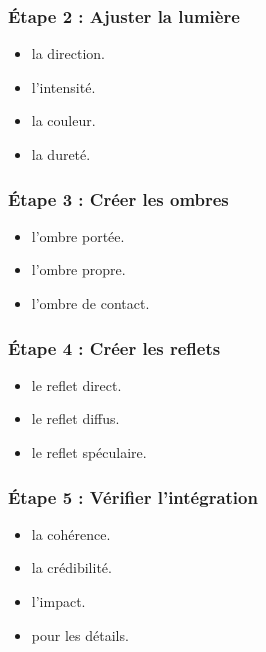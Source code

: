 \subsubsection{Étape 2 : Ajuster la lumière}

\begin{itemize}
    \item {} la direction.
    \item {} l'intensité.
    \item {} la couleur.
    \item {} la dureté.
\end{itemize}

\subsubsection{Étape 3 : Créer les ombres}

\begin{itemize}
    \item {} l'ombre portée.
    \item {} l'ombre propre.
    \item {} l'ombre de contact.
\end{itemize}

\subsubsection{Étape 4 : Créer les reflets}

\begin{itemize}
    \item {} le reflet direct.
    \item {} le reflet diffus.
    \item {} le reflet spéculaire.
\end{itemize}

\subsubsection{Étape 5 : Vérifier l'intégration}

\begin{itemize}
    \item {} la cohérence.
    \item {} la crédibilité.
    \item {} l'impact.
    \item {} pour les détails.
\end{itemize}

